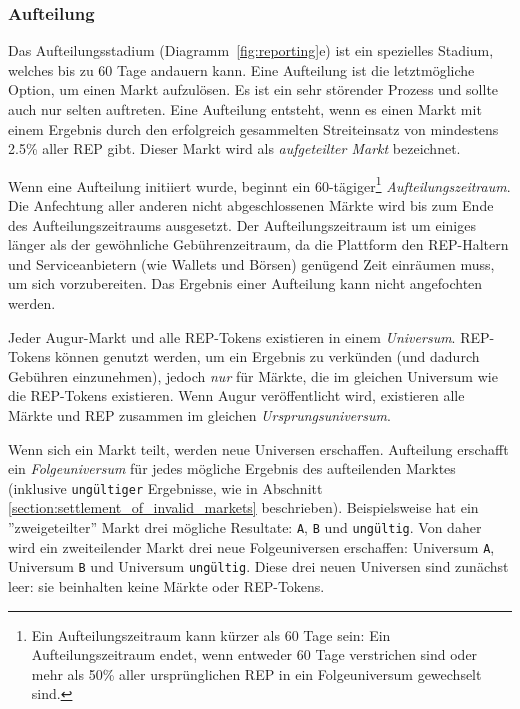 \documentclass[floatfix,reprint,nofootinbib,amsmath,amssymb,epsfig,pre,floats,letterpaper,groupedaffiliation]{revtex4-1}
\theoremstyle{definition}
\theoremstyle{definition}
\theoremstyle{definition}
\begin{document}
\subsubsection{Aufteilung}\label{section:fork}

Das Aufteilungsstadium (Diagramm~\ref{fig:reporting}e) ist ein spezielles Stadium, welches bis zu 60 Tage andauern kann. Eine Aufteilung ist die letztmögliche Option, um einen Markt aufzulösen. Es ist ein sehr störender Prozess und sollte auch nur selten auftreten. Eine Aufteilung entsteht, wenn es einen Markt mit einem Ergebnis durch den erfolgreich gesammelten Streiteinsatz von mindestens 2.5\% aller REP gibt. Dieser Markt wird als \textit{aufgeteilter Markt} bezeichnet.

Wenn eine Aufteilung initiiert wurde, beginnt ein 60-tägiger\footnote{Ein Aufteilungszeitraum kann kürzer als 60 Tage sein: Ein Aufteilungszeitraum endet, wenn entweder 60 Tage verstrichen sind oder mehr als 50\% aller ursprünglichen REP in ein Folgeuniversum gewechselt sind.} \textit{Aufteilungszeitraum}. Die Anfechtung aller anderen nicht abgeschlossenen Märkte wird bis zum Ende des Aufteilungszeitraums ausgesetzt. Der Aufteilungszeitraum ist um einiges länger als der gewöhnliche Gebührenzeitraum, da die Plattform den REP-Haltern und Serviceanbietern (wie Wallets und Börsen) genügend Zeit einräumen muss, um sich vorzubereiten. Das Ergebnis einer Aufteilung kann nicht angefochten werden.

Jeder Augur-Markt und alle REP-Tokens existieren in einem \textit{Universum}. REP-Tokens können genutzt werden, um ein Ergebnis zu verkünden (und dadurch Gebühren einzunehmen), jedoch \textit{nur} für Märkte, die im gleichen Universum wie die REP-Tokens existieren. Wenn Augur veröffentlicht wird, existieren alle Märkte und REP zusammen im gleichen \textit{Ursprungsuniversum}.

Wenn sich ein Markt teilt, werden neue Universen erschaffen. Aufteilung erschafft ein \textit{Folgeuniversum} für jedes mögliche Ergebnis des aufteilenden Marktes (inklusive \texttt{ungültiger} Ergebnisse, wie in Abschnitt \ref{section:settlement_of_invalid_markets} beschrieben). Beispielsweise hat ein ''zweigeteilter'' Markt drei mögliche Resultate: \texttt{A}, \texttt{B} und \texttt{ungültig}. Von daher wird ein zweiteilender Markt drei neue Folgeuniversen erschaffen: Universum \texttt{A}, Universum \texttt{B} und Universum \texttt{ungültig}. Diese drei neuen Universen sind zunächst leer: sie beinhalten keine Märkte oder REP-Tokens.
\end{document}

